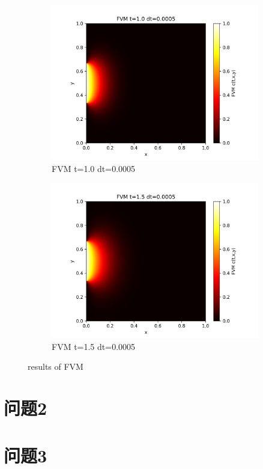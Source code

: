 \documentclass[11pt,a4 paper,one side]{article}
\begin{document}
\begin{figure}[htbp]
    \vspace{0.5cm}  %
    
    \begin{subfigure}{0.45\textwidth}
        \includegraphics[width=\textwidth]{FVM t=1.0 dt=0.0005.png}
        \caption{FVM t=1.0 dt=0.0005}
        \label{FVM t=1.0 dt=0.0005}
    \end{subfigure}
    \hfill
    \begin{subfigure}{0.45\textwidth}
        \includegraphics[width=\textwidth]{FVM t=1.5 dt=0.0005.png}
        \caption{FVM t=1.5 dt=0.0005}
        \label{FVM t=1.5 dt=0.0005}
    \end{subfigure}
    
    \caption{results of FVM}
    \label{results of FVM}
\end{figure}

\section{问题2}
\section{问题3}
\end{document}
